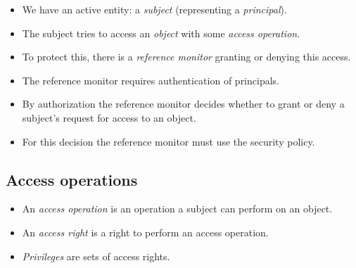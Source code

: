 \begin{frame}
  \begin{definition}
    \begin{itemize}
      \item We have an active entity: a \emph{subject} (representing 
        a \emph{principal}).

      \item The subject tries to access an \emph{object} with some \emph{access 
          operation}.

      \item To protect this, there is a \emph{reference monitor} granting or 
        denying this access.
    \end{itemize}
  \end{definition}
\end{frame}

\begin{frame}
  \begin{idea}
    \begin{itemize}
      \item The reference monitor requires authentication of principals.

      \item By authorization the reference monitor decides whether to grant or 
        deny a subject's request for access to an object.

      \item For this decision the reference monitor must use the security policy.
    \end{itemize}
  \end{idea}
\end{frame}


\subsection{Access operations}

\begin{frame}
  \begin{definition}
    \begin{itemize}
      \item An \emph{access operation} is an operation a subject can perform on 
        an object.

      \item An \emph{access right} is a right to perform an access operation.

      \item \emph{Privileges} are sets of access rights.
    \end{itemize}
  \end{definition}
\end{frame}

